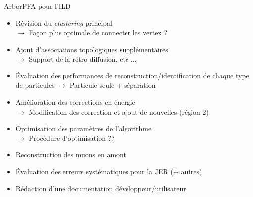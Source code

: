 \documentclass[8pt]{beamer}
\begin{document}
  \begin{frame}
  \frametitle{\secname}
  \framesubtitle{\subsecname}
    \begin{block}{ArborPFA pour l'ILD}
      \begin{itemize}
        \pause
        \item Révision du \textit{clustering} principal \\
        $\rightarrow$ Façon plus optimale de connecter les vertex ?
        \pause
        \item Ajout d'associations topologiques supplémentaires \\
        $\rightarrow$ Support de la rétro-diffusion, etc ...
        \pause
        \item Évaluation des performances de reconstruction/identification de chaque type de particules
        $\rightarrow$ Particule seule + séparation
        \pause
        \item Amélioration des corrections en énergie \\
        $\rightarrow$ Modification des correction et ajout de nouvelles (région 2)
        \pause
        \item Optimisation des paramètres de l'algorithme \\
        $\rightarrow$ Procédure d'optimisation ??
        \pause
        \item Reconstruction des muons en amont
        \pause
        \item Évaluation des erreurs systématiques pour la JER (+ autres)
        \pause
        \item Rédaction d'une documentation développeur/utilisateur
      \end{itemize}
    \end{block}
  \end{frame}
\end{document}
